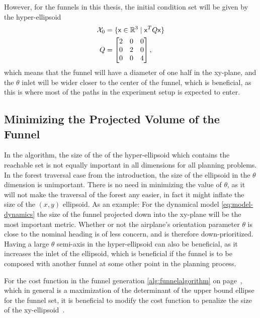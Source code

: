However, for the funnels in this thesis, the initial condition set will be given
by the hyper-ellipsoid
\begin{align}
  \mathcal{X}_0 &= \lbrace{\mathbf{\mathsf{x}}} \in \mathbb{R}^{3} \mid {\mathbf{\mathsf{x}}}^{T} Q {\mathbf{\mathsf{x}}}\rbrace \\
  Q &= \begin{bmatrix}
    2 & 0 & 0 \\
    0 & 2 & 0 \\
    0 & 0 & 4
  \end{bmatrix},
\end{align}
which means that the funnel will have a diameter of one half in the xy-plane,
and the \(\theta\) inlet will be wider closer to the center of the funnel, which
is beneficial, as this is where most of the paths in the experiment setup is
expected to enter.

\subsection{Minimizing the Projected Volume of the Funnel}
\label{subsec:xy-cost-function}

In the \rrtfunnel{} algorithm, the size of the of the hyper-ellipsoid which
contains the reachable set is not equally important in all dimensions for all
planning problems. In the forest traversal case from the introduction, the size
of the ellipsoid in the \(\theta\) dimension is unimportant. There is no need in
minimizing the value of \(\theta\), as it will not make the traversal of the
forest any easier, in fact it might inflate the size of the \((x,y)\) ellipsoid.
As an example: For the dynamical model \eqref{eq:model-dynamics} the size of the
funnel projected down into the xy-plane will be the most important metric.
Whether or not the airplane's orientation parameter \(\theta\) is close to the
nominal heading is of less concern, and is therefore down-prioritized. Having a
large \(\theta\) semi-axis in the hyper-ellipsoid can also be beneficial, as it
increases the inlet of the ellipsoid, which is beneficial if the funnel is to be
composed with another funnel at some other point in the planning process.

For the cost function in the funnel generation \cref{alg:funnelalgorithm} on
page~\pageref{alg:funnelalgorithm}, which in general is a maximization of the
determinant of the upper bound ellipse for the funnel set, it is beneficial to
modify the cost function to penalize the size of the
xy-ellipsoid~\cite{majumdarRobustOnlineMotion2013}.

